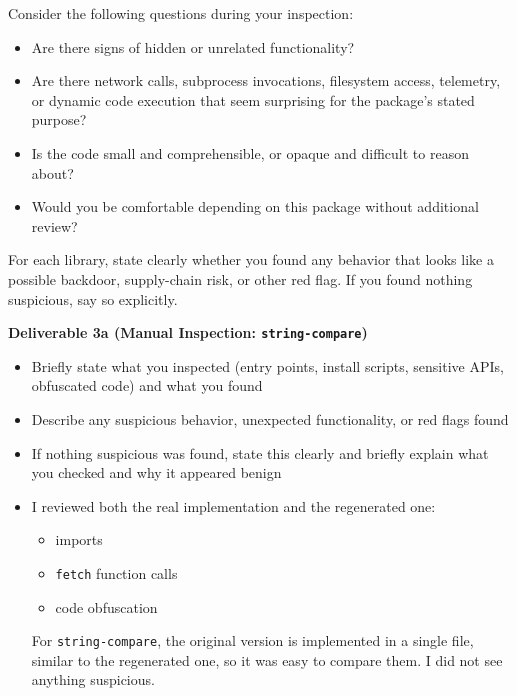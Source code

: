 Consider the following questions during your inspection:

\begin{itemize}
    \item Are there signs of hidden or unrelated functionality?
    \item Are there network calls, subprocess invocations, filesystem access, telemetry,
          or dynamic code execution that seem surprising for the package's stated purpose?
    \item Is the code small and comprehensible, or opaque and difficult to reason about?
    \item Would you be comfortable depending on this package without additional review?
\end{itemize}


For each library, state clearly whether you found any behavior that looks like a possible
backdoor, supply-chain risk, or other red flag. If you found nothing suspicious, say so
explicitly.

\begin{tcolorbox}[colback=yellow!10,colframe=black,boxrule=0.5pt]
\textbf{Deliverable 3a (Manual Inspection: \texttt{string-compare})}

\begin{itemize}
    \item Briefly state what you inspected (\eg entry points, install scripts, sensitive APIs, obfuscated code) and what you found
    \item Describe any suspicious behavior, unexpected functionality, or red flags found
    \item If nothing suspicious was found, state this clearly and briefly explain what you checked and why it appeared benign
\end{itemize}
\end{tcolorbox}

\begin{tcolorbox}[colback=blue!10,colframe=blue!70!black,boxrule=0.5pt]
\begin{itemize}
    \item I reviewed both the real implementation and the regenerated one:
    \begin{itemize}
        \item imports
        \item \texttt{fetch} function calls
        \item code obfuscation
    \end{itemize}
    For \texttt{string-compare}, the original version is implemented in a single file, similar to the regenerated one, so it was easy to compare them. I did not see anything suspicious.
    
\end{itemize}
\end{tcolorbox}

